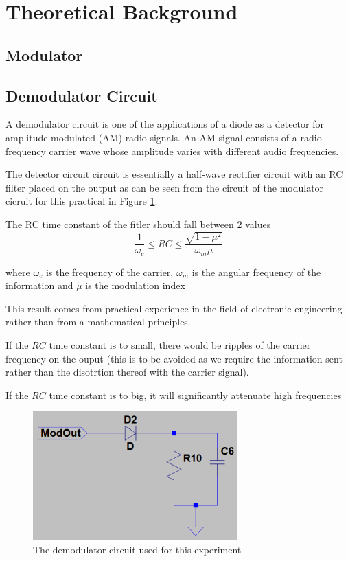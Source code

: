 \documentclass[12pt, a4paper]{article}
\begin{document}
\section{Theoretical Background}

	\subsection{Modulator}
	\subsection{Demodulator Circuit}
		A demodulator circuit is one of the applications of a diode as a detector for amplitude modulated (AM) radio signals. An AM signal consists of a radio-frequency carrier wave whose amplitude varies with different audio frequencies.

		The detector circuit circuit is essentially a half-wave rectifier circuit with an RC filter placed on the output as can be seen from the circuit of the modulator cicruit for this practical in Figure \ref{demodulator_circuit}.

		The RC time constant of the fitler should fall between 2 values
		\begin{equation}
			\frac{1}{\omega_c} \le RC \le \frac{\sqrt{1-\mu^2}}{\omega_m\mu}
		\end{equation}

		where $\omega_c$ is the frequency of the carrier, $\omega_m$ is the angular frequency of the information and $\mu$ is the modulation index

		This result comes from practical experience in the field of electronic engineering rather than from a mathematical principles.

		If the $RC$ time constant is to small, there would be ripples of the carrier frequency on the ouput (this is to be avoided as we require the information sent rather than the disotrtion thereof with the carrier signal).

		If the $RC$ time constant is to big, it will significantly attenuate high frequencies 


		\begin{figure}[H]
			\centering
			\includegraphics[width=0.7\textwidth]{images/Demodulator_circuit.png}
			\caption{The demodulator circuit used for this experiment}
			\label{demodulator_circuit}
		\end{figure}
\end{document}
